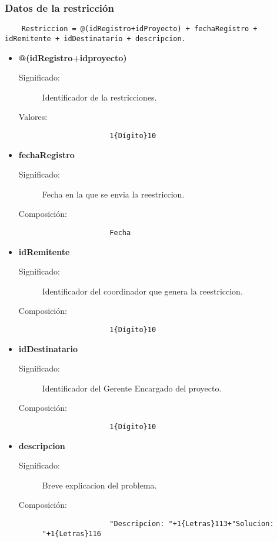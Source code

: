 \subsubsection{Datos de la restricción}
\begin{lstlisting}
	Restriccion = @(idRegistro+idProyecto) + fechaRegistro + idRemitente + idDestinatario + descripcion.
\end{lstlisting}
\begin{itemize}
	\item	\textbf{@(idRegistro+idproyecto)}
		\begin{description}
			\item [Significado:] Identificador de la restricciones.
			\item [Valores:]{\begin{lstlisting}
				1{Dígito}10\end{lstlisting}}
		\end{description}
	\item \textbf{fechaRegistro}
		\begin{description}
			\item [Significado:] Fecha en la que se envia la reestriccion.
			\item [Composición:]{\begin{lstlisting}
				Fecha\end{lstlisting}}
		\end{description}
	\item \textbf{idRemitente}
		\begin{description}
			\item [Significado:] Identificador del coordinador que genera la reestriccion.
			\item [Composición:]{\begin{lstlisting}
				1{Dígito}10\end{lstlisting}}
		\end{description}
	\item \textbf{idDestinatario}
		\begin{description}
			\item [Significado:] Identificador del Gerente Encargado del proyecto.
			\item [Composición:]{\begin{lstlisting}
				1{Dígito}10\end{lstlisting}}
		\end{description}
	\item \textbf{descripcion}
		\begin{description}
			\item [Significado:] Breve explicacion del problema.
			\item [Composición:]{\begin{lstlisting}
				"Descripcion: "+1{Letras}113+"Solucion: "+1{Letras}116\end{lstlisting}}
		\end{description}
\end{itemize}

